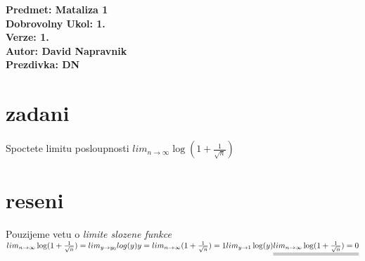 \documentclass[a4paper]{article}
\def\doubleunderline#1{\underline{\underline{#1}}}
\begin{document}
\noindent
\textbf{Predmet: Mataliza 1}\\
\textbf{Dobrovolny Ukol: 1.}\\
\textbf{Verze: 1.}\\
\textbf{Autor: David Napravnik}\\
\textbf{Prezdivka: DN}

\section*{zadani}
Spoctete limitu posloupnosti $lim_{n \rightarrow \infty}\log(1+\frac{1}{\sqrt{n}})$

\section*{reseni}
Pouzijeme vetu o \textit{limite slozene funkce}\\
$
	lim_{n \rightarrow \infty}\log(1+\frac{1}{\sqrt{n}}) =
	lim_{y \rightarrow y_0}log(y)\\
	y = lim_{n \rightarrow \infty}(1+\frac{1}{\sqrt{n}}) = 1\\
	lim_{y \rightarrow 1}\log(y)\\
	\doubleunderline{
		lim_{n \rightarrow \infty}\log(1+\frac{1}{\sqrt{n}}) = 0
	}\\
$
\end{document}
